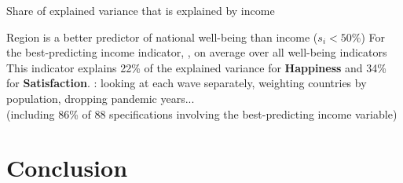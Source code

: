 \documentclass[aspectratio=169,xcolor=dvipsnames, 11pt,mathserif]{beamer}
\begin{document}
\begin{frame}{Share of explained variance that is explained by income\label{share_gdp} \hyperlink{share_gdp_add}{}}
    
\end{frame}

\begin{frame}{Region is a better predictor of national well-being than income}
    \bbvsp
    \ip {} ($s_i < 50\%$)
    \ip For the best-predicting income indicator, , on average over all well-being indicators
    \ip This indicator explains 22\% of the explained variance for \textbf{Happiness} and 34\% for \textbf{Satisfaction}.
    \ip {}: looking at each wave separately, weighting countries by population, dropping pandemic years... \\(including 86\% of 88 specifications involving the best-predicting income variable) \hyperlink{share_gdp_add}{}
    \ee
\end{frame}

\section{Conclusion}
\end{document}
